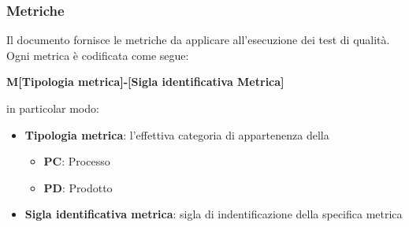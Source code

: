 \subsubsection{Metriche}
Il documento  fornisce le metriche da applicare all'esecuzione dei test di qualità.
\\Ogni metrica è codificata come segue:
\begin{center}
    \textbf{M[Tipologia metrica]-[Sigla identificativa Metrica]}
\end{center}
in particolar modo:
\begin{itemize}
	\item{\textbf{Tipologia metrica}: l'effettiva categoria di appartenenza della }
	\begin{itemize}
		\item{\textbf{PC}: Processo}
		\item{\textbf{PD}: Prodotto}
	\end{itemize}
	\item{\textbf{Sigla identificativa metrica}: sigla di indentificazione della specifica metrica}
\end{itemize}
